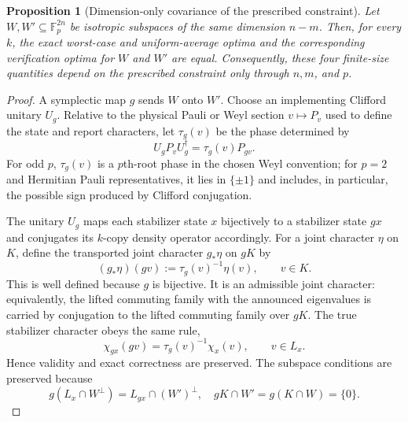 \documentclass[11pt]{article}
\newcommand{\F}{\mathbb F}
\newcommand{\1}{\mathbf 1}
\theoremstyle{plain}
\newtheorem{proposition}[theorem]{Proposition}
\theoremstyle{definition}
\theoremstyle{remark}
\begin{document}
\begin{proposition}[Dimension-only covariance of the prescribed constraint]
\label{prop:fixed-W-dimension-only-covariance}
Let $W,W'\subseteq\F_p^{2n}$ be isotropic subspaces of the same dimension
$n-m$.  Then, for every $k$, the exact worst-case and uniform-average optima
and the corresponding verification optima for $W$ and $W'$ are equal.
Consequently, these four finite-size quantities depend on the prescribed
constraint only through $n,m$, and $p$.
\end{proposition}
\begin{proof}
A symplectic map $g$ sends $W$ onto $W'$.  Choose an implementing Clifford
unitary $U_g$.  Relative to the physical Pauli or Weyl section
$v\mapsto P_v$ used to define the state and report characters, let
$\tau_g(v)$ be the phase determined by
\begin{equation}
 U_gP_vU_g^\dagger=\tau_g(v)P_{gv}.
 \label{eq:fixed-W-clifford-section-phase}
\end{equation}
For odd $p$, $\tau_g(v)$ is a $p$th-root phase in the chosen Weyl convention;
for $p=2$ and Hermitian Pauli representatives, it lies in $\{\pm1\}$ and
includes, in particular, the possible sign produced by Clifford conjugation.

The unitary $U_g$ maps each stabilizer state $x$ bijectively to a stabilizer
state $gx$ and conjugates its $k$-copy density operator accordingly.  For a
joint character $\eta$ on $K$, define the transported joint character
$g_*\eta$ on $gK$ by
\begin{equation}
 (g_*\eta)(gv):=\tau_g(v)^{-1}\eta(v),
 \qquad v\in K.
 \label{eq:fixed-W-clifford-character-transport}
\end{equation}
This is well defined because $g$ is bijective.  It is an admissible joint
character: equivalently, the lifted commuting family with the announced
eigenvalues is carried by conjugation to the lifted commuting family over
$gK$.  The true stabilizer character obeys the same rule,
\begin{equation}
 \chi_{gx}(gv)=\tau_g(v)^{-1}\chi_x(v),
 \qquad v\in L_x.
 \label{eq:fixed-W-true-character-transport}
\end{equation}
Hence validity and exact correctness are preserved.  The subspace conditions
are preserved because
\begin{equation}
 g(L_x\cap W^\perp)=L_{gx}\cap (W')^\perp,
 \quad gK\cap W'=g(K\cap W)=\{0\}.
 \label{eq:fixed-W-covariance-valid-output}
\end{equation}


\end{proof}
\end{document}

